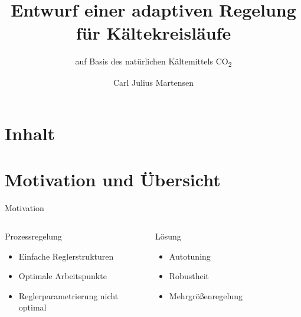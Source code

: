 \documentclass[fleqn,11pt,aspectratio=43]{beamer}
\title{Entwurf einer adaptiven Regelung für Kältekreisläufe}
\subtitle{auf Basis des natürlichen Kältemittels CO\textsubscript{2}}
\author{Carl Julius Martensen}
\begin{document}
\begin{frame}[plain]
\titlepage
\end{frame}

\section*{Inhalt}
\begin{frame}
\tableofcontents
\end{frame}

\section{Motivation und Übersicht}

\begin{frame}{Motivation}
  \begin{columns}[onlytextwidth]
	\begin{exampleblock}{Prozessregelung}
		\begin{itemize}
			\item Einfache Reglerstrukturen
			\item Optimale Arbeitspunkte
			\item Reglerparametrierung nicht optimal
		\end{itemize}
	\end{exampleblock}
	\begin{alertblock}{Lösung}
	\begin{itemize}
		\item Autotuning
		\item Robustheit
		\item Mehrgrößenregelung
	\end{itemize}
	\end{alertblock}
    \begin{figure}\centering
    \resizebox{\textwidth}{!}{}
    \end{figure}
  \end{columns}
\end{frame}

\end{document}
